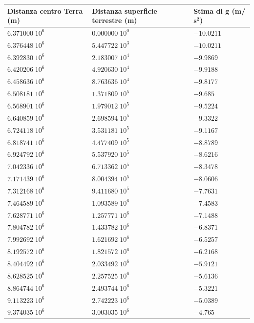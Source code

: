 \documentclass[10pt,a4paper]{book}
\begin{document}
\newpage
\begin{tabular}{|l|l|l|}
	\hline 
	\textbf{Distanza centro Terra (m)}&\textbf{Distanza superficie terrestre (m)}&\textbf{Stima di g (m/$\mathbf{s^2}$)} \\ 
	\hline 
$6.371000\;10^6$ & $0.000000\;10^0$ & $-10.0211$ \\
\hline
$6.376448\;10^6$ & $5.447722\;10^3$ & $-10.0211$ \\
\hline
$6.392830\;10^6$ & $2.183007\;10^4$ & $-9.9869$ \\
\hline
$6.420206\;10^6$ & $4.920630\;10^4$ & $-9.9188$ \\
\hline
$6.458636\;10^6$ & $8.763636\;10^4$ & $-9.8177$ \\
\hline
$6.508181\;10^6$ & $1.371809\;10^5$ & $-9.685$ \\
\hline
$6.568901\;10^6$ & $1.979012\;10^5$ & $-9.5224$ \\
\hline
$6.640859\;10^6$ & $2.698594\;10^5$ & $-9.3322$ \\
\hline
$6.724118\;10^6$ & $3.531181\;10^5$ & $-9.1167$ \\
\hline
$6.818741\;10^6$ & $4.477409\;10^5$ & $-8.8789$ \\
\hline
$6.924792\;10^6$ & $5.537920\;10^5$ & $-8.6216$ \\
\hline
$7.042336\;10^6$ & $6.713362\;10^5$ & $-8.3478$ \\
\hline
$7.171439\;10^6$ & $8.004394\;10^5$ & $-8.0606$ \\
\hline
$7.312168\;10^6$ & $9.411680\;10^5$ & $-7.7631$ \\
\hline
$7.464589\;10^6$ & $1.093589\;10^6$ & $-7.4583$ \\
\hline
$7.628771\;10^6$ & $1.257771\;10^6$ & $-7.1488$ \\
\hline
$7.804782\;10^6$ & $1.433782\;10^6$ & $-6.8371$ \\
\hline
$7.992692\;10^6$ & $1.621692\;10^6$ & $-6.5257$ \\
\hline
$8.192572\;10^6$ & $1.821572\;10^6$ & $-6.2168$ \\
\hline
$8.404492\;10^6$ & $2.033492\;10^6$ & $-5.9121$ \\
\hline
$8.628525\;10^6$ & $2.257525\;10^6$ & $-5.6136$ \\
\hline
$8.864744\;10^6$ & $2.493744\;10^6$ & $-5.3221$ \\
\hline
$9.113223\;10^6$ & $2.742223\;10^6$ & $-5.0389$ \\
\hline
$9.374035\;10^6$ & $3.003035\;10^6$ & $-4.765$ \\
\hline

\end{tabular}
\end{document}
